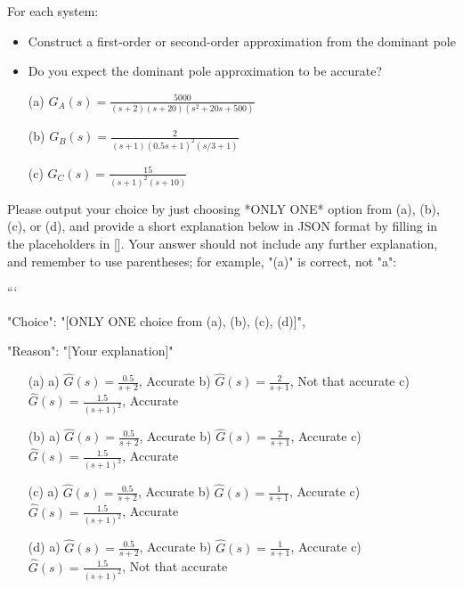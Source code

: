 \documentclass[12pt]{article}
\begin{document}
For each system:
\begin{itemize}
    \item Construct a first-order or second-order approximation from the dominant pole
    \item Do you expect the dominant pole approximation to be accurate?
\end{itemize}
\begin{itemize}
    \item[(a)] \(G_A(s) = \frac{5000}{(s+2)(s+20)(s^2+20s+500)}\)
    \item[(b)] \(G_B(s) = \frac{2}{(s+1)(0.5 s+1)^2(s/3+1)}\)
    \item[(c)] \(G_C(s) = \frac{15}{(s+1)^2(s+10)}\)
\end{itemize}
Please output your choice by just choosing *ONLY ONE* option from (a), (b), (c), or (d), and provide a short explanation below in JSON format by filling in the placeholders in []. Your answer should not include any further explanation, and remember to use parentheses; for example, "(a)" is correct, not "a":

```
{

"Choice": "[ONLY ONE choice from (a), (b), (c), (d)]",

"Reason": "[Your explanation]"

}

\begin{itemize}
    \item[(a)] a) \(\hat{G}(s) = \frac{0.5}{s+2}\), Accurate b) \(\hat{G}(s) = \frac{2}{s+1}\), Not that accurate c) \(\hat{G}(s) = \frac{1.5}{(s+1)^2}\), Accurate
    \item[(b)] a) \(\hat{G}(s) = \frac{0.5}{s+2}\), Accurate b) \(\hat{G}(s) = \frac{2}{s+1}\), Accurate c) \(\hat{G}(s) = \frac{1.5}{(s+1)^2}\), Accurate
    \item[(c)] a) \(\hat{G}(s) = \frac{0.5}{s+2}\), Accurate b) \(\hat{G}(s) = \frac{1}{s+1}\), Accurate c) \(\hat{G}(s) = \frac{1.5}{(s+1)^2}\), Accurate
    \item[(d)] a) \(\hat{G}(s) = \frac{0.5}{s+2}\), Accurate b) \(\hat{G}(s) = \frac{1}{s+1}\), Accurate c) \(\hat{G}(s) = \frac{1.5}{(s+1)^2}\), Not that accurate
\end{itemize}
\end{document}
